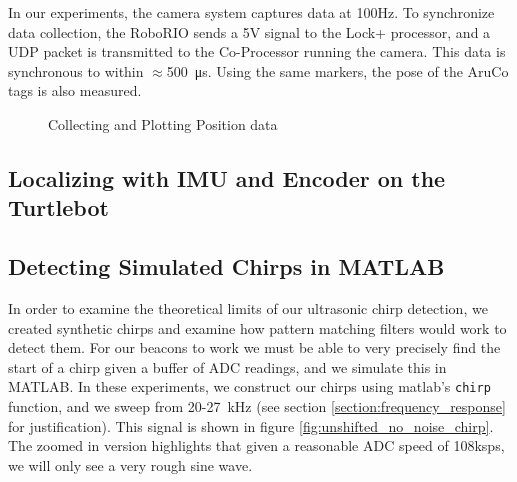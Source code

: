 \documentclass{article}
\begin{document}
    In our experiments, the camera system captures data at 100Hz. To synchronize data collection, the RoboRIO sends a 5V signal to the Lock+ processor, and a UDP packet is transmitted to the Co-Processor running the camera. This data is synchronous to within $\approx$\SI{500}{\micro\second}. Using the same markers, the pose of the AruCo tags is also measured.

    \begin{figure}[H]%
      \centering
      \qquad
      \caption{Collecting and Plotting Position data}%
      \label{fig:positionData}%
    \end{figure}


  \subsection{Localizing with IMU and Encoder on the Turtlebot}


  \subsection{Detecting Simulated Chirps in MATLAB}

    In order to examine the theoretical limits of our ultrasonic chirp detection, we created synthetic chirps and examine how pattern matching filters would work to detect them. For our beacons to work we must be able to very precisely find the start of a chirp given a buffer of ADC readings, and we simulate this in MATLAB. In these experiments, we construct our chirps using matlab's \texttt{chirp} function, and we sweep from 20-27\SI{}{\kilo\hertz} (see section \ref{section:frequency_response} for justification). This signal is shown in figure \ref{fig:unshifted_no_noise_chirp}. The zoomed in version highlights that given a reasonable ADC speed of 108ksps, we will only see a very rough sine wave.
\end{document}
